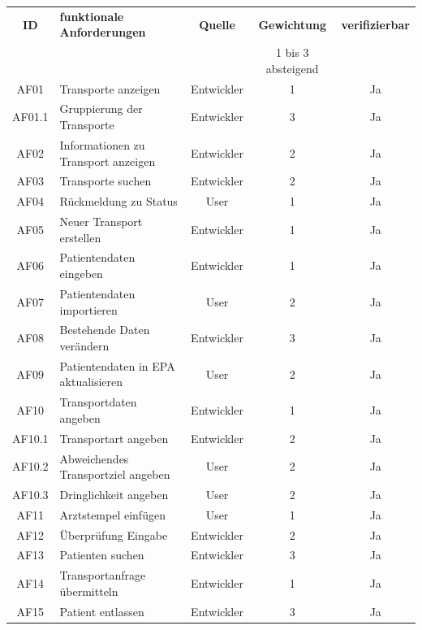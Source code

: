 \documentclass[a4paper, ngerman, 12pt]{scrartcl}
\begin{document}
 \begin{adjustbox}{max width=\textwidth}
\begin{tabular}{|c|l|c|c|c|}
\hline
\rowcolor{lightgray}\textbf{ID}	&\textbf{funktionale Anforderungen}	&\textbf{Quelle}&\textbf{Gewichtung}	&\textbf{verifizierbar}\\
\rowcolor{lightgray}	&						&		&\scriptsize{1 bis 3 absteigend}			&\\
\hline
AF01&Transporte anzeigen						&Entwickler		&1		&Ja\\
\hline
AF01.1&Gruppierung der Transporte						&Entwickler		&3		&Ja\\
\hline
AF02&Informationen zu Transport anzeigen
						&Entwickler		&2		&Ja\\
\hline
AF03&Transporte suchen
						&Entwickler		&2		&Ja\\
\hline
AF04&Rückmeldung zu Status
						&User		&1		&Ja\\
\hline
AF05&Neuer Transport erstellen
						&Entwickler		&1		&Ja\\
\hline
AF06&Patientendaten eingeben
						&Entwickler		&1		&Ja\\
\hline
AF07&Patientendaten importieren
						&User		&2		&Ja\\
\hline
AF08&Bestehende Daten verändern
						&Entwickler		&3		&Ja\\
\hline
AF09&Patientendaten in EPA aktualisieren
						&User		&2		&Ja\\
\hline
AF10&Transportdaten angeben
						&Entwickler		&1		&Ja\\
\hline
AF10.1&Transportart angeben
						&Entwickler		&2		&Ja\\
\hline
AF10.2&Abweichendes Transportziel angeben
						&User		&2		&Ja\\
\hline
AF10.3&Dringlichkeit angeben
						&User		&2		&Ja\\
\hline
AF11&Arztstempel einfügen
						&User		&1		&Ja\\
\hline
AF12&Überprüfung Eingabe
						&Entwickler		&2		&Ja\\
\hline
AF13&Patienten suchen
						&Entwickler		&3		&Ja\\
\hline
AF14&Transportanfrage übermitteln
						&Entwickler		&1		&Ja\\
\hline
AF15&Patient entlassen
						&Entwickler		&3		&Ja\\
\hline
\end{tabular}
\end{adjustbox}\\[1em]
\end{document}
